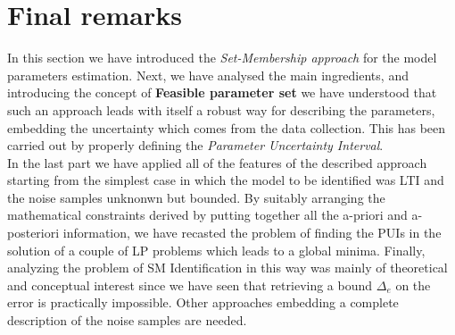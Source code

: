 \section{Final remarks}
In this section we have introduced the \textit{Set-Membership approach} for the model parameters estimation. Next, we have analysed the main ingredients, and introducing the concept of \textbf{Feasible parameter set} we have understood that such an approach leads with itself a robust way for describing the parameters, embedding the uncertainty which comes from the data collection. This has been carried out by properly defining the \textit{Parameter Uncertainty Interval}. \\

In the last part we have applied all of the features of the described approach starting from the simplest case in which the model to be identified was LTI and the noise samples unknonwn but bounded. By suitably arranging the mathematical constraints derived by putting together all the a-priori and a-posteriori information, we have recasted the problem of finding the PUIs in the solution of a couple of LP problems which leads to a global minima. Finally, analyzing the problem of SM Identification in this way was mainly of theoretical and conceptual interest since we have seen that retrieving a bound $\Delta_e$ on the error is practically impossible. Other approaches embedding a complete description of the noise samples are needed.


